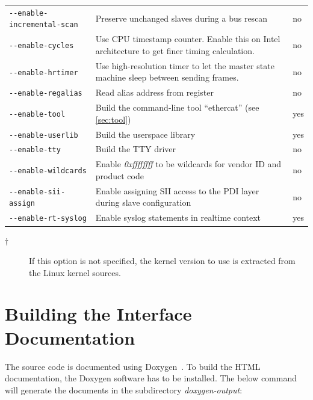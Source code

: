 \documentclass[a4paper,12pt,BCOR=6mm,bibtotoc,idxtotoc]{scrbook}
\begin{document}
\begin{longtable}{l|p{}|l}
\lstinline+--enable-incremental-scan+ & Preserve unchanged slaves during a
bus rescan & no\\

\lstinline+--enable-cycles+ & Use CPU timestamp counter. Enable this on Intel
architecture to get finer timing calculation. & no\\

\lstinline+--enable-hrtimer+ & Use high-resolution timer to let the master
state machine sleep between sending frames. & no\\

\lstinline+--enable-regalias+ & Read alias address from register & no\\

\lstinline+--enable-tool+ & Build the command-line tool ``ethercat'' (see
\autoref{sec:tool}) & yes\\

\lstinline+--enable-userlib+ & Build the userspace library & yes\\

\lstinline+--enable-tty+ & Build the TTY driver & no\\

\lstinline+--enable-wildcards+ & Enable \textit{0xffffffff} to be wildcards
for vendor ID and product code & no\\

\lstinline+--enable-sii-assign+ & Enable assigning SII access to the PDI layer
during slave configuration & no\\

\lstinline+--enable-rt-syslog+ & Enable syslog statements in realtime context &
yes\\

\hline

\end{longtable}

\begin{description}

\item[$\dagger$] If this option is not specified, the kernel version to use is
extracted from the Linux kernel sources.

\end{description}

\section{Building the Interface Documentation}
\label{sec:gendoc}

The source code is documented using Doxygen~\cite{doxygen}. To build the HTML
documentation, the Doxygen software has to be installed. The below command
will generate the documents in the subdirectory \textit{doxygen-output}:
\end{document}
